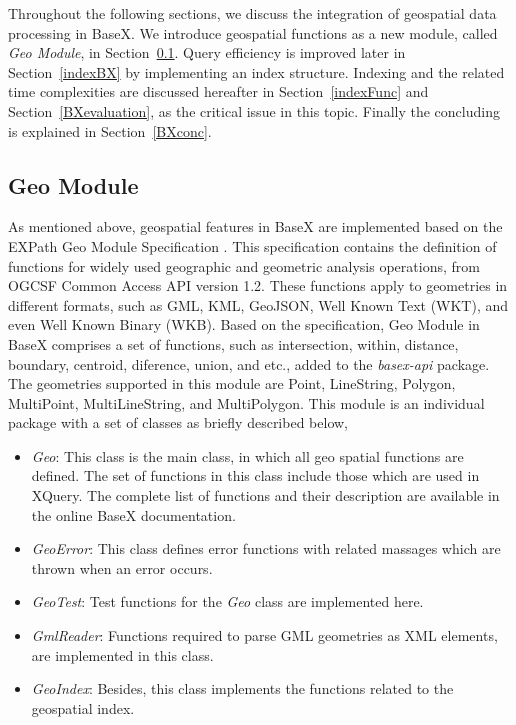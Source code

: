 \documentclass[a4paper,12pt]{article}
\begin{document}
Throughout the following sections, we discuss the integration of geospatial data processing in BaseX. We introduce geospatial functions as a new module, called \textit{Geo Module}, in Section~\ref{geomodule}. Query efficiency is improved later in Section~\ref{indexBX} by implementing an index structure. Indexing and the related time complexities are discussed hereafter in Section~\ref{indexFunc} and Section~\ref{BXevaluation}, as the critical issue in this topic. Finally the concluding is explained in Section~\ref{BXconc}.

\subsection{Geo Module}
\label{geomodule}
As mentioned above, geospatial features in BaseX are implemented based on the EXPath Geo Module Specification \cite{expath}. This specification contains the definition of functions for widely used geographic and geometric analysis operations, from OGCSF Common Access API version 1.2. These functions apply to geometries in different formats, such as GML, KML, GeoJSON, Well Known Text (WKT), and even Well Known Binary (WKB). Based on the specification, Geo Module in BaseX comprises a set of functions, such as intersection, within, distance, boundary, centroid, diference, union, and etc., added to the \textit{basex-api} package. The geometries supported in this module are Point, LineString, Polygon, MultiPoint, MultiLineString, and MultiPolygon. This module is an individual package with a set of classes as briefly described below,
\begin{itemize}
\item \textit{Geo}: This class is the main class, in which all geo spatial functions are defined. The set of functions in this class include those which are used in XQuery. The complete list of functions and their description are available in the online BaseX documentation.
\item \textit{GeoError}: This class defines error functions with related massages which are thrown when an error occurs.
\item \textit{GeoTest}: Test functions for the \textit{Geo} class are implemented here.
\item \textit{GmlReader}: Functions required to parse GML geometries as XML elements, are implemented in this class.
\item \textit{GeoIndex}: Besides, this class implements the functions related to the geospatial index. 
\end{itemize}
\end{document}
